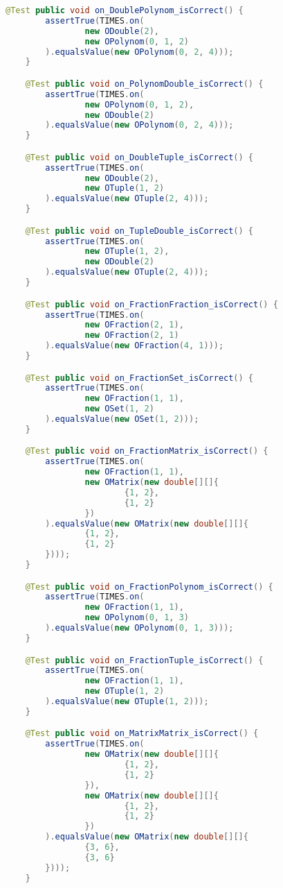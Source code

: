 \begin{lstlisting}[caption=TimesTest (Schwenke),label=list:TimesTest,language=Java]
    @Test public void on_DoublePolynom_isCorrect() {
        assertTrue(TIMES.on(
                new ODouble(2),
                new OPolynom(0, 1, 2)
        ).equalsValue(new OPolynom(0, 2, 4)));
    }

    @Test public void on_PolynomDouble_isCorrect() {
        assertTrue(TIMES.on(
                new OPolynom(0, 1, 2),
                new ODouble(2)
        ).equalsValue(new OPolynom(0, 2, 4)));
    }

    @Test public void on_DoubleTuple_isCorrect() {
        assertTrue(TIMES.on(
                new ODouble(2),
                new OTuple(1, 2)
        ).equalsValue(new OTuple(2, 4)));
    }

    @Test public void on_TupleDouble_isCorrect() {
        assertTrue(TIMES.on(
                new OTuple(1, 2),
                new ODouble(2)
        ).equalsValue(new OTuple(2, 4)));
    }

    @Test public void on_FractionFraction_isCorrect() {
        assertTrue(TIMES.on(
                new OFraction(2, 1),
                new OFraction(2, 1)
        ).equalsValue(new OFraction(4, 1)));
    }

    @Test public void on_FractionSet_isCorrect() {
        assertTrue(TIMES.on(
                new OFraction(1, 1),
                new OSet(1, 2)
        ).equalsValue(new OSet(1, 2)));
    }

    @Test public void on_FractionMatrix_isCorrect() {
        assertTrue(TIMES.on(
                new OFraction(1, 1),
                new OMatrix(new double[][]{
                        {1, 2},
                        {1, 2}
                })
        ).equalsValue(new OMatrix(new double[][]{
                {1, 2},
                {1, 2}
        })));
    }

    @Test public void on_FractionPolynom_isCorrect() {
        assertTrue(TIMES.on(
                new OFraction(1, 1),
                new OPolynom(0, 1, 3)
        ).equalsValue(new OPolynom(0, 1, 3)));
    }

    @Test public void on_FractionTuple_isCorrect() {
        assertTrue(TIMES.on(
                new OFraction(1, 1),
                new OTuple(1, 2)
        ).equalsValue(new OTuple(1, 2)));
    }

    @Test public void on_MatrixMatrix_isCorrect() {
        assertTrue(TIMES.on(
                new OMatrix(new double[][]{
                        {1, 2},
                        {1, 2}
                }),
                new OMatrix(new double[][]{
                        {1, 2},
                        {1, 2}
                })
        ).equalsValue(new OMatrix(new double[][]{
                {3, 6},
                {3, 6}
        })));
    }


\end{lstlisting}
